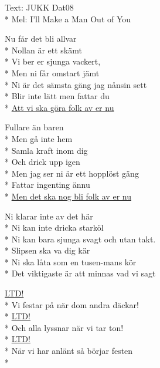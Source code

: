 \begin{SongText}
    \begin{SongInfo}
        Text: JUKK Dat08\\*%
        Mel: I’ll Make a Man Out of You
    \end{SongInfo}
    \begin{SongVerse}
        Nu får det bli allvar\\*%
        Nollan är ett skämt\\*%
        Vi ber er sjunga vackert,\\*%
        Men ni får omstart jämt\\*%
        Ni är det sämsta gäng jag nånsin sett\\*%
        Blir inte lätt men fattar du\\*%
        \underline{Att vi ska göra folk av er nu}
    \end{SongVerse}
    \begin{SongVerse}
        Fullare än baren\\*%
        Men gå inte hem\\*%
        Samla kraft inom dig\\*%
        Och drick upp igen\\*%
        Men jag ser ni är ett hopplöst gäng\\*%
        Fattar ingenting ännu\\*%
        \underline{Men det ska nog bli folk av er nu}
    \end{SongVerse} 
    \begin{SongVerse}
        Ni klarar inte av det här\\*%
        Ni kan inte dricka starköl\\*%
        Ni kan bara sjunga svagt och utan takt.\\*%
        Slipsen ska va dig kär\\*%
        Ni ska låta som en tusen-mans kör\\*%
        Det viktigaste är att minnas vad vi sagt
    \end{SongVerse}
    \begin{SongVerse}
        \underline{LTD!}\\*%
        Vi festar på när dom andra däckar!\\*%
        \underline{LTD!}\\*%
        Och alla lyssnar när vi tar ton!\\*%
        \underline{LTD!}\\*%
        När vi har anlänt så börjar festen\\*%

\end{SongVerse}
\end{SongText}
